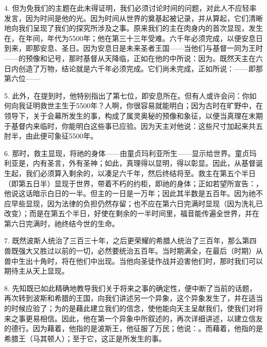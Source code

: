 4. 但为免我们的主题在此未得证明，我们必须讨论时间的问题，对此人不应轻率发言，因为时间是他的光。因为时间从世界的奠基起被记录，并从算起，它们清晰地向我们呈现了我们的探究所涉及之事。原来我们的主在肉身内的首次显现，发生在，在年间，年代为5500年；他在第三十三年受难。六千年必须完成，以便安息日到来，即那安息、圣日。因为安息日是未来圣者王国——当他们与基督一同为王时——的预像和记号，那时基督从天降临，正如在他的中所说：因为。既然天主在六日内创造了万物，结论就是六千年必须完成。它们尚未完成，正如所说：——即那第六位——\par

5. 此外，在提到时，他特别指出了第七位，即安息所在。但有人或许会问：你如何向我证明救世主生于5500年？人啊，你很容易就能明白；因为古时在旷野中，在领导下，关于会幕所发生的事，构成了属灵奥秘的预像和象征，以便当真理在末期于基督内来临时，你能明白这些事已应验。因为天主对他说：这些尺寸加起来共五肘半，由此便可象征5500年。\par

6. 那时，救主显现，将祂的身体——由童贞玛利亚所生——显示给世界。童贞玛利亚是，内有圣言，外有圣神；如此，真理得以显明，得以彰显。因此，从基督诞生起，我们必须算入剩余的，以凑足六千年，然后终结将至。救主在第五个半日（即第五日半）显现于世界，带着不朽的约柜，即祂的身体；正如若望所宣告：，他说这话暗示白日的一半。但主的一日是一万年；因此其半数是五百年。因为祂不应早些显现，因为法律的负担仍然存留；也不应在第六日完满时显现（因为洗礼已改变）；而是在第五个半日，好使在剩余的一半时间里，福音能传遍全世界，并在第六日完满时，祂终结今世的生命。\par

7. 既然波斯人统治了三百三十年，之后更荣耀的希腊人统治了三百年，那么第四兽既强大又胜过以前的一切，必然要统治五百年。当时期满全，在最后（时期）从兽中生出十角时，将在他们中出现。当他向圣徒作战并迫害他们时，那时我们可以期待主从天上显现。\par

8. 先知既已如此精确地教导我们关于将来之事的确定性，便中断了当前的话题，再次转到波斯和希腊的王国，向我们讲述另一个异象，这个异象发生了，并在适当的时候应验了；为的是藉此建立我们的信念，使他能向天主呈献我们，使我们对将来之事更易相信。因此，他在第一个异象中所叙述的，再次详细讲述，以建立信友的德行。因为藉着，他指的是波斯王，他征服了万民；他说：。而藉着，他指的是希腊王（马其顿人）；至于它，这正是所发生的事。\par

